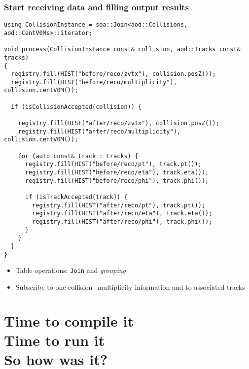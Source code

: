 \documentclass[14pt,aspectratio=169,t]{beamer}
\begin{document}
\begin{frame}[fragile]
  \frametitle{Start receiving data and filling output results}
  {\tiny\color{blue}
  \vspace{-0.25in}
  \begin{verbatim}
using CollisionInstance = soa::Join<aod::Collisions, aod::CentV0Ms>::iterator;

void process(CollisionInstance const& collision, aod::Tracks const& tracks)
{
  registry.fill(HIST("before/reco/zvtx"), collision.posZ());
  registry.fill(HIST("before/reco/multiplicity"), collision.centV0M());

  if (isCollisionAccepted(collision)) {

    registry.fill(HIST("after/reco/zvtx"), collision.posZ());
    registry.fill(HIST("after/reco/multiplicity"), collision.centV0M());

    for (auto const& track : tracks) {
      registry.fill(HIST("before/reco/pt"), track.pt());
      registry.fill(HIST("before/reco/eta"), track.eta());
      registry.fill(HIST("before/reco/phi"), track.phi());

      if (isTrackAccepted(track)) {
        registry.fill(HIST("after/reco/pt"), track.pt());
        registry.fill(HIST("after/reco/eta"), track.eta());
        registry.fill(HIST("after/reco/phi"), track.phi());
      }
    }
  }
}
  \end{verbatim}}
  \vspace{-0.4in}
  \begin{itemize}
    \small
    \item Table operations: \verb|Join| and \textit{grouping}
    \item Subscribe to one collision$+$multiplicity information and to associated tracks
  \end{itemize}
\end{frame}

\section{Time to compile it\\Time to run it\\So how was it?}
\end{document}

